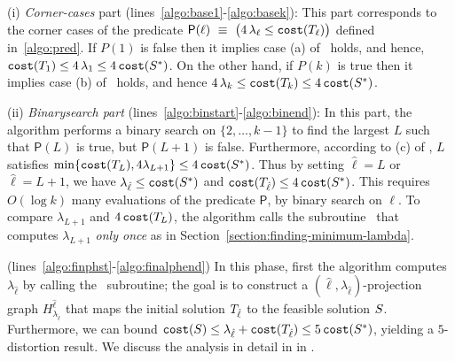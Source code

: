 \documentclass{article}
\begin{document}
\noindent (i) \textit{Corner-cases} part (lines~\ref{algo:base1}-\ref{algo:basek}):
This part corresponds to the corner cases of the predicate  $\mathsf{P}(\ell) ~\equiv~ \bigl( 4\,\lambda_{\ell} \leq \texttt{cost}(T_{\ell}) \bigr)$ defined in~\cref{algo:pred}. 
If $P(1)$ is false then it implies case (a) of~ holds, and hence, $\texttt{cost}(T_{1}) \leq 4\,\lambda_{1} \leq 4\,\texttt{cost}(S^*)$. 
On the other hand, if $P(k)$ is true then it implies case (b) of~ holds, and hence $4\,\lambda_{k} \leq \texttt{cost}(T_{k}) \leq 4\,\texttt{cost}(S^*)$.  

\noindent(ii) \textit{Binarysearch part} (lines~\ref{algo:binstart}-\ref{algo:binend}): In this part, the algorithm performs a binary search on $\{2,\dots, k-1\}$ to find the largest $L$ such that $\mathsf{P}({L})$ is true, but $\mathsf{P}({L}+1)$ is false. 
Furthermore, according to (c) of , $L$ satisfies $\min \{\texttt{cost}(T_{L}), 4 \lambda_{L+1}\} \leq 4\,\texttt{cost}(S^*)$. 
Thus by setting $\hat{\ell} = L$ or $\hat{\ell} = L+1$, we have $\lambda_{\hat{\ell}} \leq \texttt{cost}(S^*)$ and $\texttt{cost}(T_{\hat{\ell}}) \leq 4\, \texttt{cost}(S^*)$. 
This requires $O(\log k)$ many evaluations of the predicate $\mathsf{P}$, by binary search on $\ell$. 
To compare $\lambda_{L+1}$ and $4\,\texttt{cost}(T_{L})$, the algorithm calls the subroutine \findlambda\ that computes $\lambda_{L+1}$ \emph{only once} as in Section~\ref{section:finding-minimum-lambda}.



 (lines~\ref{algo:finphst}-\ref{algo:finalphend}) 
In this phase, first the algorithm computes $\lambda_{\hat{\ell}}$ by calling the \findlambda\ subroutine;  the goal is to construct a $(\hat{\ell}, \lambda_{\hat{\ell}})$-projection graph $H^{\hat{\ell}}_{\lambda_{\hat{\ell}}}$ that maps the initial solution $T_{\hat{\ell}}$ to the feasible solution $S$.
Furthermore, we can bound $\texttt{cost}(S) \leq \lambda_{\hat{\ell}} + \texttt{cost}(T_{\hat{\ell}}) \leq 5\, \texttt{cost}(S^*)$, yielding a $5$-distortion result.
We discuss the analysis in detail in in .


\end{document}
